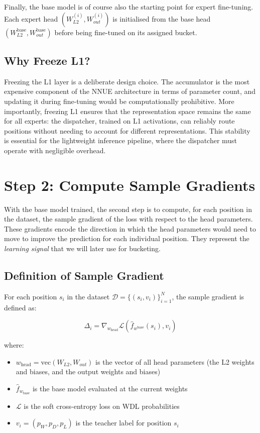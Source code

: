 Finally, the base model is of course also the starting point for expert fine-tuning. Each expert head $(W_{L2}^{(i)}, W_{out}^{(i)})$ is initialised from the base head $(W_{L2}^{\text{base}}, W_{out}^{\text{base}})$ before being fine-tuned on its assigned bucket.


\subsection{Why Freeze L1?}

Freezing the L1 layer is a deliberate design choice. The accumulator is the most expensive component of the NNUE architecture in terms of parameter count, and updating it during fine-tuning would be computationally prohibitive. More importantly, freezing L1 ensures that the representation space remains the same for all experts: the dispatcher, trained on L1 activations, can reliably route positions without needing to account for different representations. This stability is essential for the lightweight inference pipeline, where the dispatcher must operate with negligible overhead.


\section{Step 2: Compute Sample Gradients}

With the base model trained, the second step is to compute, for each position in the dataset, the sample gradient of the loss with respect to the head parameters. These gradients encode the direction in which the head parameters would need to move to improve the prediction for each individual position. They represent the \emph{learning signal} that we will later use for bucketing.

\subsection{Definition of Sample Gradient}

For each position $s_i$ in the dataset $\mathcal{D} = \{(s_i, v_i)\}_{i=1}^N$, the sample gradient is defined as:

\[\Delta_i = \nabla_{w_{\text{head}}} \mathcal{L}(\hat{f}_{w^{\text{base}}}(s_i), v_i)\]

where:

\begin{itemize}
  \item $w_{\text{head}} = \text{vec}(W_{L2}, W_{out})$ is the vector of all head parameters (the L2 weights and biases, and the output weights and biases)
  \item $\hat{f}_{w_{\text{base}}}$ is the base model evaluated at the current weights
  \item $\mathcal{L}$ is the soft cross-entropy loss on WDL probabilities
  \item $v_i = (p_W, p_D, p_L)$ is the teacher label for position $s_i$
\end{itemize}



